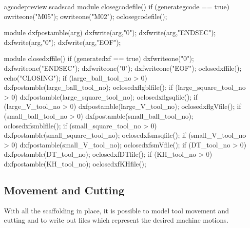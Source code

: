 \documentclass{ltxdoc}
\begin{document}
\lstset{firstnumber=\thegcpscad}
\begin{writecode}{a}{gcodepreview.scad}{scad}
module closegcodefile() {
  if (generategcode == true) {
    owriteone("M05");
    owriteone("M02");
    oclosegcodefile();
  }
}

module dxfpostamble(arg) {
    dxfwrite(arg,"0");
    dxfwrite(arg,"ENDSEC");
    dxfwrite(arg,"0");
    dxfwrite(arg,"EOF");
}

module closedxffile() {
  if (generatedxf == true) {
    dxfwriteone("0");
    dxfwriteone("ENDSEC");
    dxfwriteone("0");
    dxfwriteone("EOF");
    oclosedxffile();
    echo("CLOSING");
    if (large_ball_tool_no >  0) {    dxfpostamble(large_ball_tool_no);
      oclosedxflgblfile();
    } 
    if (large_square_tool_no >  0) {    dxfpostamble(large_square_tool_no);
      oclosedxflgsqfile();
    } 
    if (large_V_tool_no >  0) {    dxfpostamble(large_V_tool_no);
      oclosedxflgVfile();
    } 
    if (small_ball_tool_no >  0) {    dxfpostamble(small_ball_tool_no);
      oclosedxfsmblfile();
    } 
    if (small_square_tool_no >  0) {    dxfpostamble(small_square_tool_no);
      oclosedxfsmsqfile();
    } 
    if (small_V_tool_no >  0) {    dxfpostamble(small_V_tool_no);
      oclosedxfsmVfile();
    } 
    if (DT_tool_no >  0) {    dxfpostamble(DT_tool_no);
      oclosedxfDTfile();
    } 
    if (KH_tool_no >  0) {    dxfpostamble(KH_tool_no);
      oclosedxfKHfile();
    } 
  }
}

\end{writecode}
\addtocounter{gcpscad}{50}

%
 
\subsection{Movement and Cutting}

%
With all the scaffolding in place, it is possible to model tool movement
and cutting and to write out files which represent the desired machine motions.
 
\end{document}
